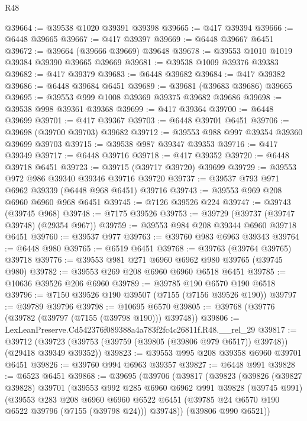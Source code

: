 \begin{lexlean}{R48}
\begin{coremodule}
@39664 := @39538 @1020 @39391 @39398
@39665 := @417 @39394
@39666 := @6448 @39665
@39667 := @417 @39397
@39669 := @6448 @39667 @6451
@39672 := @39664 (@39666 @39669) @39648
@39678 := @39553 @1010 @1019 @39384 @39390 @39665 @39669
@39681 := @39538 @1009 @39376 @39383
@39682 := @417 @39379
@39683 := @6448 @39682
@39684 := @417 @39382
@39686 := @6448 @39684 @6451
@39689 := @39681 (@39683 @39686) @39665
@39695 := @39553 @999 @1008 @39369 @39375 @39682 @39686
@39698 := @39538 @998 @39361 @39368
@39699 := @417 @39364
@39700 := @6448 @39699
@39701 := @417 @39367
@39703 := @6448 @39701 @6451
@39706 := @39698 (@39700 @39703) @39682
@39712 := @39553 @988 @997 @39354 @39360 @39699 @39703
@39715 := @39538 @987 @39347 @39353
@39716 := @417 @39349
@39717 := @6448 @39716
@39718 := @417 @39352
@39720 := @6448 @39718 @6451
@39723 := @39715 (@39717 @39720) @39699
@39729 := @39553 @972 @986 @39340 @39346 @39716 @39720
@39737 := @39537 @793 @971 @6962 @39339 (@6448 @968 @6451) @39716
@39743 := @39553 @969 @208 @6960 @6960 @968 @6451
@39745 := @7126 @39526 @224
@39747 := @39743 (@39745 @968)
@39748 := @7175 @39526
@39753 := @39729 (@39737 (@39747 @39748) (@29354 @967))
@39759 := @39553 @984 @208 @39344 @6960 @39718 @6451
@39760 := @39537 @977
@39763 := @39760 @983 @6963 @39343
@39764 := @6448 @980
@39765 := @6519 @6451
@39768 := @39763 (@39764 @39765) @39718
@39776 := @39553 @981 @271 @6960 @6962 @980 @39765 (@39745 @980)
@39782 := @39553 @269 @208 @6960 @6960 @6518 @6451
@39785 := @10636 @39526 @206 @6960
@39789 := @39785 @190 @6570 @190 @6518
@39796 := @7150 @39526 @190 @39507 (@7155 (@7156 @39526 @190))
@39797 := @39789 @39796
@39798 := @10695 @6570
@39805 := @39768 (@39776 (@39782 (@39797 (@7155 (@39798 @190))) @39748))
@39806 := LexLeanPreserve.Cd542376f089388a4a783f2fc4c26811f.R48.__rel_29
@39817 := @39712
    (@39723 (@39753 (@39759 (@39805 (@39806 @979 @6517)) @39748)) (@29418 @39349 @39352))
@39823 := @39553 @995 @208 @39358 @6960 @39701 @6451
@39826 := @39760 @994 @6963 @39357
@39827 := @6448 @991
@39828 := @6523 @6451
@39868 := @39695
    (@39706
      (@39817
        (@39823
          (@39826
            (@39827 @39828)
            @39701
            (@39553
              @992
              @285
              @6960
              @6962
              @991
              @39828
              (@39745 @991)
              (@39553
                @283
                @208
                @6960
                @6960
                @6522
                @6451
                (@39785 @24 @6570 @190 @6522 @39796 (@7155 (@39798 @24)))
                @39748))
            (@39806 @990 @6521))

\end{coremodule}
\end{lexlean}
